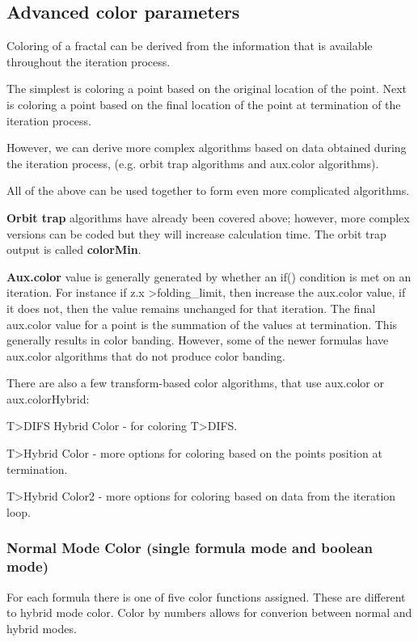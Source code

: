 \subsection{Advanced color parameters}\label{materials-advanced-color-parameters}

Coloring of a fractal can be derived from the information that is available throughout the iteration process.

The simplest is coloring a point based on the original location of the point.
Next is coloring a point based on the final location of the point at termination of the iteration process.

However, we can derive more complex algorithms based on data obtained during the iteration process, (e.g. orbit trap algorithms and aux.color algorithms).

All of the above can be used together to form even more complicated algorithms.

\textbf{Orbit trap} algorithms have already been covered above; however, more complex versions can be coded but they will increase calculation time. The orbit trap output is called \textbf{colorMin}.

\textbf{Aux.color} value is generally generated by whether an if() condition is met on an iteration. For instance if z.x \textgreater\space folding\_limit, then increase the aux.color value, if it does not, then the value remains unchanged for that iteration. The final aux.color value for a point is the summation of the values at termination. This generally results in color banding. However, some of the newer formulas have aux.color algorithms that do not produce color banding.

There are also a few transform-based color algorithms, that use aux.color or aux.colorHybrid:

T>DIFS Hybrid Color - for coloring T>DIFS.

T>Hybrid Color - more options for coloring based on the points position at termination.

T>Hybrid Color2 - more options for coloring based on data from the iteration loop.

\subsubsection{Normal Mode Color (single formula mode and boolean mode)}\label{materials-normal-mode-color}

For each formula there is one of five color functions assigned.
These are different to hybrid mode color. Color by numbers allows for converion between normal and hybrid modes.


